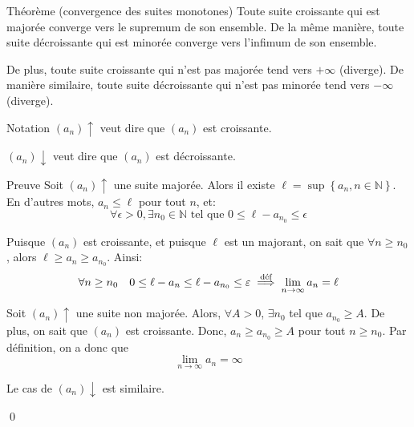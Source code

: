 \documentclass[a4paper]{article}
\begin{document}
\begin{parag}{Théorème (convergence des suites monotones)}
    Toute suite croissante qui est majorée converge vers le supremum de son ensemble. De la même manière, toute suite décroissante qui est minorée converge vers l'infimum de son ensemble.

    De plus, toute suite croissante qui n'est pas majorée tend vers $+\infty$ (diverge). De manière similaire, toute suite décroissante qui n'est pas minorée tend vers $-\infty$ (diverge).

    \begin{subparag}{Notation}
        $\left(a_n\right)\uparrow$ veut dire que $\left(a_n\right)$ est croissante.

        $\left(a_n\right)\downarrow$ veut dire que $\left(a_n\right)$ est décroissante.
    \end{subparag}

    \begin{subparag}{Preuve}
        Soit $\left(a_n\right)\uparrow$ une suite majorée. Alors il existe $\ell = \sup\left\{a_n, n \in \mathbb{N}\right\}$. En d'autres mots, $a_n \leq \ell$ pour tout $n$, et:
        \[\forall \epsilon > 0, \exists n_0 \in \mathbb{N} \text{ tel que } 0 \leq \ell - a_{n_0} \leq \epsilon\]

        Puisque $\left(a_n\right)$ est croissante, et puisque $\ell$ est un majorant, on sait que $\forall n \geq n_0$, alors $\ell \geq a_n \geq a_{n_0}$. Ainsi: 
        \[\forall n \geq n_0 \quad 0 \leq \ell - a_n \leq \ell - a_{n_0} \leq \varepsilon \overset{\text{\text{déf}}}{\implies} \lim_{n \to \infty} a_n = \ell \]

        Soit $\left(a_n\right)\uparrow$ une suite non majorée. Alors, $\forall A > 0$, $\exists n_0$ tel que $a_{n_0} \geq A$. De plus, on sait que $\left(a_n\right)$ est croissante. Donc, $a_n \geq a_{n_0} \geq A$ pour tout $n \geq n_0$. Par définition, on a donc que 
        \[\lim_{n \to \infty} a_n = \infty\]
        
        Le cas de $\left(a_n\right)\downarrow$ est similaire.

        \qed
    \end{subparag}
    
\end{parag}
\end{document}
